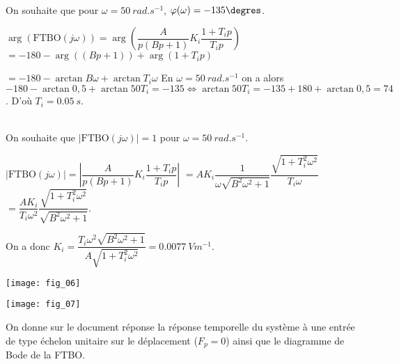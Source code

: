 \ifprof
\begin{corrige}~\\
On souhaite que  pour $\omega=\SI{50}{rad.s^{-1}}$, $\varphi(\omega)=-135\degres $.

$\arg\left(\text{FTBO}(j\omega)\right) =\arg\left(\dfrac{A}{p\left(Bp+1\right)}K_i\dfrac{1+T_ip}{T_ip}\right)	$
$ =-180-\arg\left(\left(Bp+1\right)\right)  + \arg\left(1+T_ip\right)	$

$ =-180-\arctan B\omega + \arctan T_i \omega 	$
En $\omega=\SI{50}{rad.s^{-1}}$ on a alors 
$ -180-\arctan 0,5 + \arctan 50T_i =-135 \Leftrightarrow  \arctan 50T_i =-135+180+\arctan 0,5 =74$. D'où $T_i = \SI{0,05}{s}$.
\end{corrige}
\else
\fi




\ifprof
\begin{corrige}~\\
On souhaite que $|\text{FTBO}(j\omega)|=1$ pour $\omega=\SI{50}{rad.s^{-1}}$.

$|\text{FTBO}(j\omega)| =\left|\dfrac{A}{p\left(Bp+1\right)}K_i\dfrac{1+T_ip}{T_ip}\right|$
$=A K_i\dfrac{1}{\omega \sqrt{B^2\omega^2+1}}\dfrac{\sqrt{1+T_i^2\omega^2}}{T_i \omega }$
$=\dfrac{A K_i}{T_i \omega^2}\dfrac{\sqrt{1+T_i^2\omega^2}}{ \sqrt{B^2\omega^2+1}}$.

On a donc $K_i = \dfrac{T_i \omega^2\sqrt{B^2\omega^2+1}}{A\sqrt{1+T_i^2\omega^2}}=\SI{0,0077}{Vm^{-1}}$.

\end{corrige}
\else
\fi


\ifprof
\else
\begin{marginfigure}
\texttt{[image: fig\_06]}
\end{marginfigure}

\begin{marginfigure}
\texttt{[image: fig\_07]}
\end{marginfigure}
\fi


On donne sur le document réponse la réponse temporelle du système à une entrée de type échelon unitaire sur le déplacement ($F_p=0$) ainsi que le diagramme de Bode de la FTBO.

